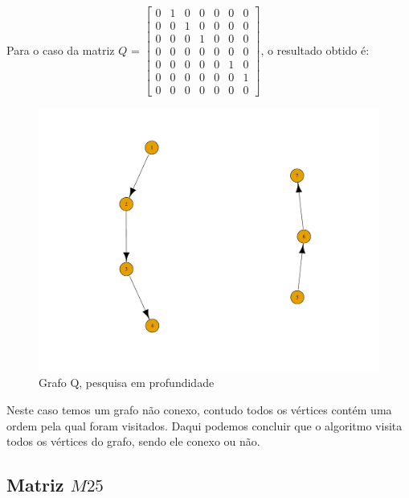 \documentclass[a4paper,12pt]{report}
\begin{document}
Para o caso da matriz $Q$ = $\begin{bmatrix}
    0&1&0&0&0&0&0\\
    0&0&1&0&0&0&0\\
    0&0&0&1&0&0&0\\
    0&0&0&0&0&0&0\\
    0&0&0&0&0&1&0\\
    0&0&0&0&0&0&1\\
    0&0&0&0&0&0&0
\end{bmatrix}$, o resultado obtido é:
\begin{figure}[H]
    \centering
        \includegraphics[scale=0.25]{img/dfsQ.pdf}
    \caption{Grafo Q, pesquisa em profundidade}
    \label{fig:dfsP}
\end{figure}

Neste caso temos um grafo não conexo, contudo todos os vértices contém uma ordem pela qual foram visitados. Daqui podemos concluir que o algoritmo visita todos os vértices do grafo, sendo ele conexo ou não.

\subsection*{Matriz $M25$}
\end{document}
